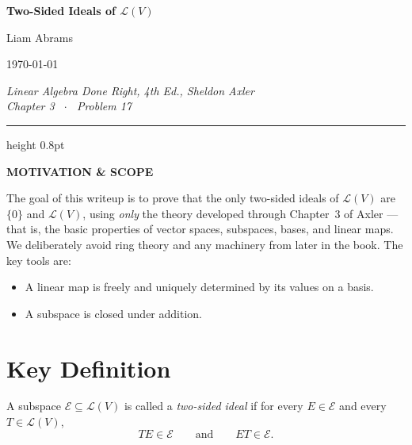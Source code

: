 \documentclass[12pt]{article}
\theoremstyle{mythmstyle}
\newenvironment{motivation}{%
  \vspace{6pt}
  \begin{mdframed}[backgroundcolor=motivationbg, linecolor=motivationgreen,
    linewidth=1.4pt, innerleftmargin=14pt, innerrightmargin=14pt,
    innertopmargin=12pt, innerbottommargin=12pt,
    skipabove=12pt, skipbelow=12pt]
  \noindent\textcolor{motivationgreen}{\textbf{\small MOTIVATION \& SCOPE}}\par\vspace{6pt}
}{%
  \end{mdframed}
  \vspace{6pt}
}
\begin{document}
\begin{center}
  {\LARGE\bfseries\color{headergray} Two-Sided Ideals of $\mathcal{L}(V)$}

  \vspace{14pt}

  {\large Liam Abrams}

  \vspace{4pt}

  {\normalsize \today}

  \vspace{10pt}

  {\normalsize\itshape
    \textit{Linear Algebra Done Right, 4th Ed.}, Sheldon Axler\\[2pt]
    Chapter 3 \ $\cdot$ \ Problem 17}
\end{center}

\vspace{20pt}
\hrule height 0.8pt
\vspace{20pt}

\begin{motivation}
The goal of this writeup is to prove that the only two-sided ideals of
$\mathcal{L}(V)$ are $\{0\}$ and $\mathcal{L}(V)$, using \emph{only} the
theory developed through Chapter~3 of Axler --- that is, the basic properties
of vector spaces, subspaces, bases, and linear maps. We deliberately avoid
ring theory and any machinery from later in the book. The key tools are:
\begin{itemize}[leftmargin=1.4em, itemsep=3pt]
  \item A linear map is freely and uniquely determined by its values on a basis.
  \item A subspace is closed under addition.
\end{itemize}
\end{motivation}

\section{Key Definition}

A subspace $\mathcal{E} \subseteq \mathcal{L}(V)$ is called a
\emph{two-sided ideal} if for every $E \in \mathcal{E}$ and every
$T \in \mathcal{L}(V)$,
\[
    TE \in \mathcal{E} \qquad \text{and} \qquad ET \in \mathcal{E}.
\]
\end{document}
